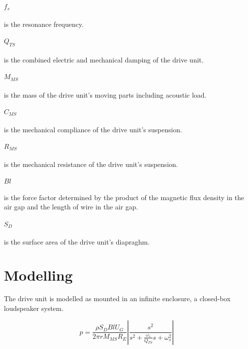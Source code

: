 \paragraph{$f_s$} is the resonance frequency.

\paragraph{$Q_{TS}$} is the combined electric and mechanical damping of the drive unit.

\paragraph{$M_{MS}$} is the mass of the drive unit's moving parts including acoustic load.

\paragraph{$C_{MS}$} is the mechanical compliance of the drive unit's suspension.

\paragraph{$R_{MS}$} is the mechanical resistance of the drive unit's suspension.

\paragraph{$Bl$} is the force factor determined by the product of the magnetic flux density in the air gap and the length of wire in the air gap.

\paragraph{$S_D$} is the surface area of the drive unit's diapraghm.

\section{Modelling}
The drive unit is modelled as mounted in an infinite enclosure, a closed-box loudspeaker system. 

\begin{equation}
p = \frac{\rho S_D B l U_G}{2\pi r M_{MS} R_E}\left|\frac{s^2}{s^2 + \frac{\omega_s}{Q_{TS}}s+\omega_s^2}\right|
\label{eq:transdriveunit}
\end{equation}

